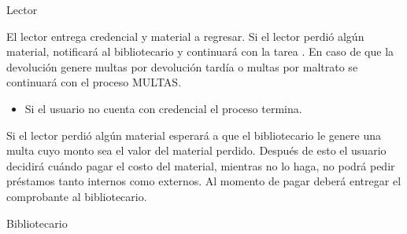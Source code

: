 \begin{PDescripcion}

  \Ppaso Lector

    \begin{enumerate}

      \Ppaso[\itarea]  El lector entrega credencial y material a regresar. Si el lector perdió algún material, notificará al bibliotecario y continuará con la tarea . En caso de que la devolución genere multas por devolución tardía o multas por maltrato se continuará con el proceso MULTAS.
	\begin{itemize}
	  \item Si el usuario no cuenta con credencial el proceso termina.
	\end{itemize}

      \Ppaso[\itarea]  Si el lector perdió algún material esperará a que el bibliotecario le genere una multa cuyo monto sea el valor del material perdido.  Después de esto el usuario decidirá cuándo pagar el costo del material, mientras no lo haga, no podrá pedir préstamos tanto internos como externos. Al momento de pagar deberá entregar el comprobante al bibliotecario.

    \end{enumerate}

  \Ppaso Bibliotecario
    \begin{enumerate}


\end{enumerate}
\end{PDescripcion}

